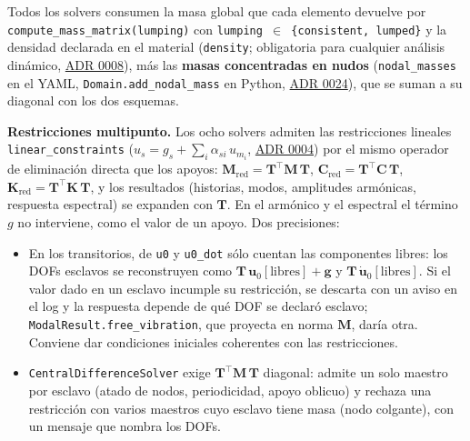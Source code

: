 \documentclass[11pt,oneside]{report}
\begin{document}
Todos los solvers consumen la masa global que cada elemento devuelve por \texttt{compute\_\allowbreak{}mass\_\allowbreak{}matrix(lumping)} con \texttt{lumping \ensuremath{\in} \{\textquotedbl{}consistent\textquotedbl{}, \textquotedbl{}lumped\textquotedbl{}\}} y la densidad declarada en el material (\texttt{density}; obligatoria para cualquier análisis dinámico, \href{https://github.com/jretamav/solidum-fem/blob/main/docs/adr/0008-densidad-propiedad-del-material.md}{ADR 0008}), más las \textbf{masas concentradas en nudos} (\texttt{nodal\_masses} en el YAML, \texttt{Domain.\allowbreak{}add\_\allowbreak{}nodal\_\allowbreak{}mass} en Python, \href{https://github.com/jretamav/solidum-fem/blob/main/docs/adr/0024-masas-de-nudo-y-modal-con-dof-sin-masa.md}{ADR 0024}), que se suman a su diagonal con los dos esquemas.

\textbf{Restricciones multipunto.} Los ocho solvers admiten las restricciones lineales \texttt{linear\_\allowbreak{}constraints} ($u_s = g_s + \sum_i \alpha_{si}\,u_{m_i}$, \href{https://github.com/jretamav/solidum-fem/blob/main/docs/adr/0004-imposicion-de-condiciones-de-dirichlet.md}{ADR 0004}) por el mismo operador de eliminación directa que los apoyos: $\mathbf M_{\text{red}} = \mathbf T^\top\mathbf M\,\mathbf T$, $\mathbf C_{\text{red}} = \mathbf T^\top\mathbf C\,\mathbf T$, $\mathbf K_{\text{red}} = \mathbf T^\top\mathbf K\,\mathbf T$, y los resultados (historias, modos, amplitudes armónicas, respuesta espectral) se expanden con $\mathbf T$. En el armónico y el espectral el término $g$ no interviene, como el valor de un apoyo. Dos precisiones:

\begin{itemize}
  \item En los transitorios, de \texttt{u0} y \texttt{u0\_dot} sólo cuentan las componentes libres: los DOFs esclavos se reconstruyen como $\mathbf T\,\mathbf u_0[\text{libres}] + \mathbf g$ y $\mathbf T\,\dot{\mathbf u}_0[\text{libres}]$. Si el valor dado en un esclavo incumple su restricción, se descarta con un aviso en el log y la respuesta depende de qué DOF se declaró esclavo; \texttt{ModalResult.\allowbreak{}free\_\allowbreak{}vibration}, que proyecta en norma $\mathbf M$, daría otra. Conviene dar condiciones iniciales coherentes con las restricciones.
  \item \texttt{CentralDifferenceSolver} exige $\mathbf T^\top\mathbf M\,\mathbf T$ diagonal: admite un solo maestro por esclavo (atado de nodos, periodicidad, apoyo oblicuo) y rechaza una restricción con varios maestros cuyo esclavo tiene masa (nodo colgante), con un mensaje que nombra los DOFs.
\end{itemize}
\end{document}
